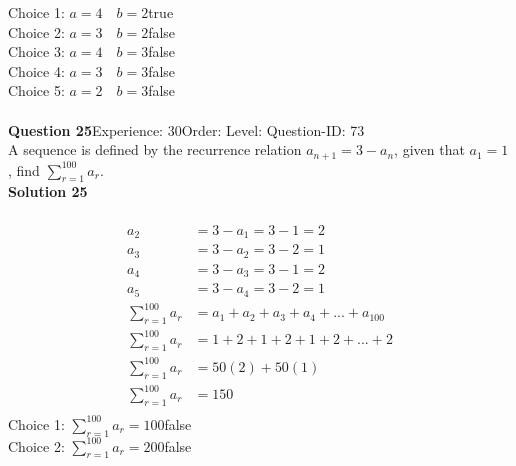 \documentclass{article}
\begin{document}
Choice 1: \hspace{20pt}$a=4\quad b=2$\hspace{20pt}true\\
Choice 2: \hspace{20pt}$a=3\quad b=2$\hspace{20pt}false\\
Choice 3: \hspace{20pt}$a=4\quad b=3$\hspace{20pt}false\\
Choice 4: \hspace{20pt}$a=3\quad b=3$\hspace{20pt}false\\
Choice 5: \hspace{20pt}$a=2\quad b=3$\hspace{20pt}false\\
\\[4pt]
\noindent\textbf{Question 25}\hspace{20pt}Experience: 30\hspace{20pt}Order: \hspace{20pt}Level: \hspace{20pt}Question-ID: 73\\[2pt]
A sequence is defined by the recurrence relation $a_{n+1}=3-a_n$, given that  $a_1 =1$, find $\displaystyle\sum_{r=1}^{100} a_r$.\\[4pt]
\noindent\textbf{Solution 25}\\[2pt]
\\[-35pt]\begin{align*}
a_2&=3-a_1=3-1=2\\[7pt]
a_3&=3-a_2=3-2=1\\[7pt]
a_4&=3-a_3=3-1=2\\[7pt]
a_5&=3-a_4=3-2=1\\[7pt]
\displaystyle\sum_{r=1}^{100} a_r &= a_1+a_2+a_3+a_4+...+a_{100}\\[2pt]
\displaystyle\sum_{r=1}^{100} a_r &= 1+2+1+2+1+2+...+2\\[2pt]
\displaystyle\sum_{r=1}^{100} a_r &= 50(2)+50(1)\\[2pt]
\displaystyle\sum_{r=1}^{100} a_r &= 150\\[2pt]
\end{align*}
Choice 1: \hspace{20pt}$\displaystyle\sum_{r=1}^{100} a_r = 100$\hspace{20pt}false\\
Choice 2: \hspace{20pt}$\displaystyle\sum_{r=1}^{100} a_r = 200$\hspace{20pt}false\\
\end{document}
